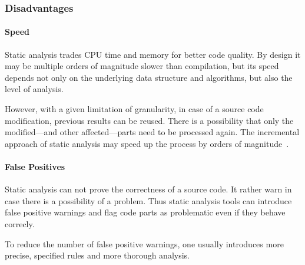 \subsubsection{Disadvantages}
\paragraph{Speed} Static analysis trades CPU time and memory for better code quality. By design it may be multiple orders of magnitude slower than compilation, but its speed depends not only on the underlying data structure and algorithms, but also the level of analysis.
%
%

However, with a given limitation of granularity, in case of a source code modification, previous results can be reused. There is a possibility that only the modified---and other affected---parts need to be processed again. The incremental approach of static analysis may speed up the process by orders of magnitude~\cite{stein-daniel-bsc}.

\paragraph{False Positives} Static analysis can not prove the correctness of a source code. It rather warn in case there is a possibility of a problem. Thus static analysis tools can introduce false positive warnings and flag code parts as problematic even if they behave correcly.

To reduce the number of false positive warnings, one usually introduces more precise, specified rules and more thorough analysis.

%
%

